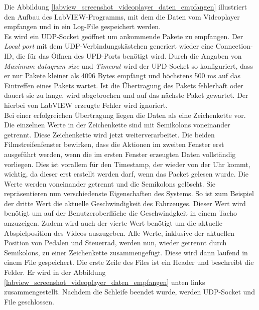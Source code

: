 Die Abbildung \ref{labview_screenshot_videoplayer_daten_empfangen} illustriert den Aufbau des LabVIEW-Programms, mit dem die Daten vom Videoplayer empfangen und in ein Log-File gespeichert werden.\\
Es wird ein UDP-Socket geöffnet um ankommende Pakete zu empfangen. Der \textit{Local port} mit dem UDP-Verbindungskästchen generiert wieder eine Connection-ID, die für das Öffnen des UPD-Ports benötigt wird. Durch die Angaben von \textit{Maximum datagram size} und \textit{Timeout} wird der UPD-Socket so konfiguriert, dass er nur Pakete kleiner als 4096 Bytes empfängt und höchstens 500 ms auf das Eintreffen eines Pakets wartet. Ist die Übertragung des Pakets fehlerhaft oder dauert sie zu lange, wird abgebrochen und auf das nächste Paket gewartet. Der hierbei von LabVIEW erzeugte Fehler wird ignoriert.\\
Bei einer erfolgreichen Übertragung liegen die Daten als eine Zeichenkette vor. Die einzelnen Werte in der Zeichenkette sind mit Semikolons voneinander getrennt. Diese Zeichenkette wird jetzt weiterverarbeitet. Die beiden Filmstreifenfenster bewirken, dass die Aktionen im zweiten Fenster erst ausgeführt werden, wenn die im ersten Fenster erzeugten Daten vollständig vorliegen. Dies ist vorallem für den Timestamp, der wieder von der Uhr kommt, wichtig, da dieser erst erstellt werden darf, wenn das Packet gelesen wurde. Die Werte werden voneinander getrennt und die Semikolons gelöscht. Sie repräsentieren nun verschiedenste Eigenschaften des Systems. So ist zum Beispiel der dritte Wert die aktuelle Geschwindigkeit des Fahrzeuges. Dieser Wert wird benötigt um auf der Benutzeroberfläche die Geschwindgkeit in einem Tacho anzuzeigen. Zudem wird auch der vierte Wert benötigt um die aktuelle Abspielposition des Videos auszugeben. Alle Werte, inklusive der aktuellen Position von Pedalen und Steuerrad, werden nun, wieder getrennt durch Semikolons, zu einer Zeichenkette zusammengefügt. Diese wird dann laufend in einem File gespeichert. Die erste Zeile des Files ist ein Header und beschreibt die Felder. Er wird in der Abbildung \ref{labview_screenshot_videoplayer_daten_empfangen} unten links zusammengestellt. Nachdem die Schleife beendet wurde, werden UDP-Socket und File geschlossen.

\newpage

